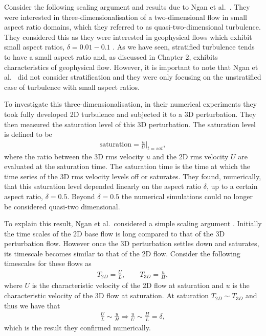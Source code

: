Consider the following scaling argument and results due to Ngan et al.\ \cite{ngan2005}. They were interested in three-dimensionalisation of a two-dimensional flow in small aspect ratio domains, which they referred to as quasi-two-dimensional turbulence. They considered this as they were interested in geophysical flows which exhibit small aspect ratios, $\delta=0.01-0.1$ \cite{ngan2005}. As we have seen, stratified turbulence tends to have a small aspect ratio and, as discussed in Chapter 2, exhibits characteristics of geophysical flow. However, it is important to note that Ngan et al.\ \cite{ngan2005} did not consider stratification and they were only focusing on the unstratified case of turbulence with small aspect ratios. 

To investigate this three-dimensionalisation, in their numerical experiments they took fully developed 2D turbulence and subjected it to a 3D perturbation. They then measured the saturation level of this 3D perturbation. The saturation level is defined to be
\begin{align}
\text{saturation} = \frac{u}{U}\bigg|_{t=sat}, \label{ngan_scale}
\end{align}
where the ratio between the 3D rms velocity $u$ and the 2D rms velocity $U$ are evaluated at the saturation time. The saturation time is the time at which the time series of the 3D rms velocity levels off or saturates. They found, numerically, that this saturation level depended linearly on the aspect ratio $\delta$, up to a certain aspect ratio, $\delta=0.5$. Beyond $\delta=0.5$ the numerical simulations could no longer be considered quasi-two dimensional. 

To explain this result, Ngan et al.\ considered a simple scaling argument \cite{ngan2004,ngan2005}. Initially the time scales of the 2D base flow is long compared to that of the 3D perturbation flow. However once the 3D perturbation settles down and saturates, its timescale becomes similar to that of the 2D flow.  Consider the following timescales for these flows \cite{ngan2005} as
\begin{align}
T_{2D} = \frac{U}{L},\qquad T_{3D} =\frac{u}{H},
\end{align}
where $U$ is the characteristic velocity of the 2D flow at saturation and $u$ is the characteristic velocity of the 3D flow at saturation. At saturation $T_{2D}\sim T_{3D}$ and thus we have that 
\begin{align}
\frac{U}{L}\sim\frac{u}{H} \Rightarrow \frac{u}{U} \sim \frac{H}{L} = \delta,
\end{align}
which is the result they confirmed numerically. 

